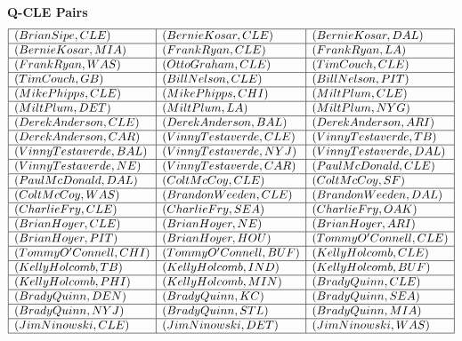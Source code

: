 \documentclass{ximera}
\begin{document}
\begin{center}

\textbf{Q-CLE Pairs} 
\quad \\



\[
\begin{array}{|l|l|l|}
\hline
(Brian Sipe, CLE) &  (Bernie Kosar, CLE) & (Bernie Kosar, DAL) \\\hline 
(Bernie Kosar, MIA) & (Frank Ryan, CLE) & (Frank Ryan, LA) \\\hline 
(Frank Ryan, WAS) & (Otto Graham, CLE) & (Tim Couch, CLE) \\\hline 
(Tim Couch, GB) & (Bill Nelson, CLE) & (Bill Nelson, PIT) \\\hline
(Mike Phipps, CLE) & (Mike Phipps, CHI) & (Milt Plum, CLE) \\\hline
(Milt Plum, DET) & (Milt Plum, LA) & (Milt Plum, NYG) \\\hline
(Derek Anderson, CLE) & (Derek Anderson, BAL) & (Derek Anderson, ARI) \\\hline
(Derek Anderson, CAR) & (Vinny Testaverde, CLE) & (Vinny Testaverde, TB) \\\hline
(Vinny Testaverde, BAL) & (Vinny Testaverde, NYJ) & (Vinny Testaverde, DAL) \\\hline 
(Vinny Testaverde, NE) & (Vinny Testaverde, CAR) & (Paul McDonald, CLE) \\\hline 
(Paul McDonald, DAL) & (Colt McCoy, CLE) & (Colt McCoy, SF) \\\hline 
(Colt McCoy, WAS) & (Brandon Weeden, CLE) & (Brandon Weeden, DAL) \\\hline 
(Charlie Fry, CLE) & (Charlie Fry, SEA) & (Charlie Fry, OAK) \\\hline 
(Brian Hoyer, CLE) & (Brian Hoyer, NE) & (Brian Hoyer, ARI) \\\hline 
(Brian Hoyer, PIT) & (Brian Hoyer, HOU) & (Tommy O'Connell, CLE) \\\hline 
(Tommy O'Connell, CHI) & (Tommy O'Connell, BUF) & (Kelly Holcomb, CLE) \\\hline 
(Kelly Holcomb, TB) & (Kelly Holcomb, IND) & (Kelly Holcomb, BUF) \\\hline 
(Kelly Holcomb, PHI) & (Kelly Holcomb, MIN) & (Brady Quinn, CLE) \\\hline 
(Brady Quinn, DEN) & (Brady Quinn, KC) &  (Brady Quinn, SEA) \\\hline 
(Brady Quinn, NYJ) & (Brady Quinn, STL) & (Brady Quinn, MIA) \\\hline 
(Jim Ninowski, CLE) & (Jim Ninowski, DET) & (Jim Ninowski, WAS) \\\hline 

\end{array}\]
\end{center}
\end{document}
